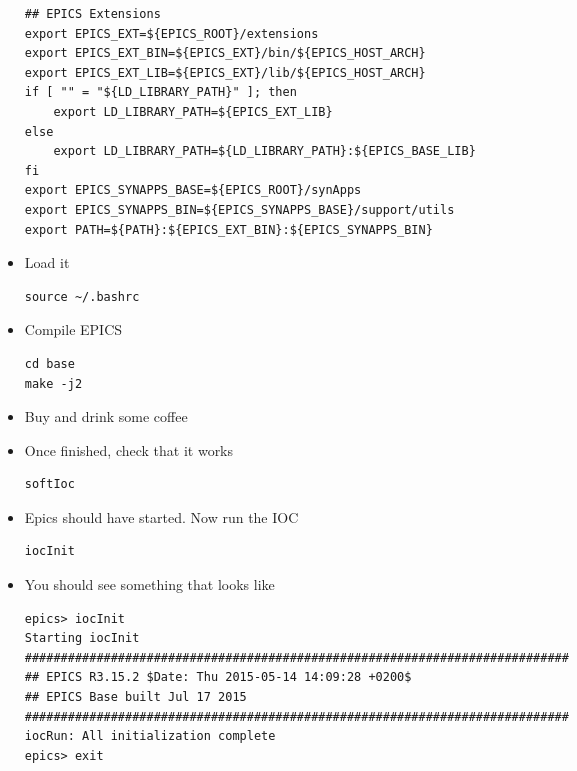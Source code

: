 \documentclass[11pt]{article}
\begin{document}
\begin{itemize}
\begin{verbatim}
## EPICS Extensions
export EPICS_EXT=${EPICS_ROOT}/extensions
export EPICS_EXT_BIN=${EPICS_EXT}/bin/${EPICS_HOST_ARCH}
export EPICS_EXT_LIB=${EPICS_EXT}/lib/${EPICS_HOST_ARCH}
if [ "" = "${LD_LIBRARY_PATH}" ]; then
    export LD_LIBRARY_PATH=${EPICS_EXT_LIB}
else
    export LD_LIBRARY_PATH=${LD_LIBRARY_PATH}:${EPICS_BASE_LIB}
fi
export EPICS_SYNAPPS_BASE=${EPICS_ROOT}/synApps
export EPICS_SYNAPPS_BIN=${EPICS_SYNAPPS_BASE}/support/utils
export PATH=${PATH}:${EPICS_EXT_BIN}:${EPICS_SYNAPPS_BIN}
\end{verbatim}
\item Load it
\begin{verbatim}
source ~/.bashrc
\end{verbatim}
\item Compile EPICS
\begin{verbatim}
cd base
make -j2
\end{verbatim}
\item Buy and drink some coffee
\item Once finished, check that it works
\begin{verbatim}
softIoc
\end{verbatim}
\item Epics should have started. Now run the IOC
\begin{verbatim}
iocInit
\end{verbatim}
\item You should see something that looks like
\begin{verbatim}
epics> iocInit  
Starting iocInit
############################################################################
## EPICS R3.15.2 $Date: Thu 2015-05-14 14:09:28 +0200$
## EPICS Base built Jul 17 2015
############################################################################
iocRun: All initialization complete
epics> exit
\end{verbatim}
\end{itemize}
\end{document}

